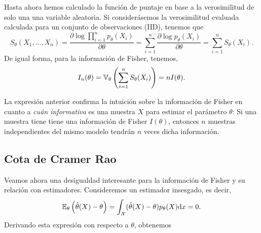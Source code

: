 Hasta ahora hemos calculado la función de puntaje en base a la verosimilitud de solo una una variable aleatoria. Si considerásemos la verosimilitud evaluada calculada para un conjunto de observaciones (IID), tenemos que
\begin{equation}
	S_\theta(X_1,\ldots,X_n) = \frac{\partial \log \prod_{i=1}^np_\theta(X_i)}{\partial\theta} = \sum_{i=1}^n\frac{\partial \log p_\theta(X_i)}{\partial\theta}= \sum_{i=1}^n S_\theta(X_i).
\end{equation}
De igual forma, para la información de Fisher, tenemos, 
\begin{equation}
	I_n(\theta) = \mathbb{V}_\theta \left(\sum_{i=1}^n S_\theta(X_i)\right) = n I(\theta).
\end{equation}
\begin{remark}
La expresión anterior confirma la intuición sobre la información de Fisher en cuanto a \emph{cuán informativa} es una muestra $X$ para estimar el parámetro $\theta$: Si una muestra tiene tiene una información de Fisher $I(\theta)$, entonces $n$ muestras independientes del mismo modelo tendrán  $n$ veces dicha información. 
\end{remark}

\subsection{Cota de Cramer Rao}

Veamos ahora una desigualdad interesante para la información de Fisher y su relación con estimadores. Consideremos un estimador insesgado, es decir, 
\begin{equation}
	\mathbb{E}_\theta \left(\hat{\theta}(X)-\theta\right)=\int_{\mathcal X} (\hat{\theta}(X)-\theta)p_\theta(X){\text{d}x}=0.
\end{equation}
Derivando esta expresión con respecto a $\theta$, obtenemos


